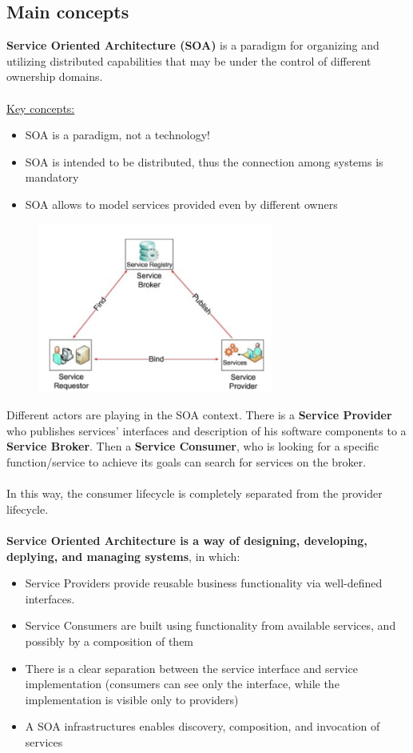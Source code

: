 \documentclass[10pt,a4paper]{article}
\begin{document}
\subsection{Main concepts}
\textbf{Service Oriented Architecture (SOA)} is a paradigm for organizing and utilizing distributed capabilities that may be under the control of different ownership domains.
\\ \\ \uline{Key concepts:}
\begin{itemize}
	\item SOA is a paradigm, not a technology!
	\item SOA is intended to be distributed, thus the connection among systems is mandatory
	\item SOA allows to model services provided even by different owners
\end{itemize}
\begin{figure}[ht!]
 \hfill \includegraphics[width=220pt]{images/soa-broker}\hspace*{\fill}
  \label{fig:soa-broker}
\end{figure}
Different actors are playing in the SOA context.
There is a \textbf{Service Provider} who publishes services' interfaces and description of his software components to a \textbf{Service Broker}. Then a \textbf{Service Consumer}, who is looking for a specific function/service to achieve its goals can search for services on the broker. \\ \\ In this way, the consumer lifecycle is completely separated from the provider lifecycle.\\ \\
\textbf{Service Oriented Architecture is a way of designing, developing, deplying, and managing systems}, in which:
\begin{itemize}
	\item Service Providers provide reusable business functionality via well-defined interfaces.
	\item Service Consumers are built using functionality from available services, and possibly by a composition of them
	\item There is a clear separation between the service interface and service implementation (consumers can see only the interface, while the implementation is visible only to providers)
	\item A SOA infrastructures enables discovery, composition, and invocation of services
\end{itemize}
\end{document}
